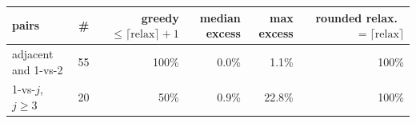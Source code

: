 \begin{tabular}{lrrrrr}
\toprule
pairs & \# & greedy $\le \lceil\text{relax}\rceil{+}1$ & median excess & max excess & rounded relax.\ $=\lceil\text{relax}\rceil$ \\
\midrule
adjacent and 1-vs-2 & 55 & 100\% & 0.0\% & 1.1\% & 100\% \\
1-vs-$j$, $j\ge3$ & 20 & 50\% & 0.9\% & 22.8\% & 100\% \\
\bottomrule
\end{tabular}
